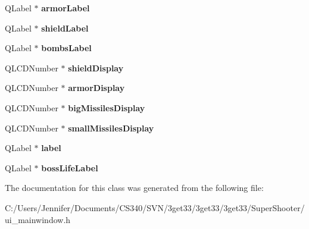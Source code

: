 \begin{DoxyCompactItemize}
\item 
\hypertarget{class_ui___main_window_afb015b408d3d27402d785876acee6737}{
QLabel $\ast$ {\bfseries armorLabel}}
\label{class_ui___main_window_afb015b408d3d27402d785876acee6737}

\item 
\hypertarget{class_ui___main_window_a9628729042c47efc05e7ad4883fb2f40}{
QLabel $\ast$ {\bfseries shieldLabel}}
\label{class_ui___main_window_a9628729042c47efc05e7ad4883fb2f40}

\item 
\hypertarget{class_ui___main_window_a537116ecd77c5999695259ad4f2db90e}{
QLabel $\ast$ {\bfseries bombsLabel}}
\label{class_ui___main_window_a537116ecd77c5999695259ad4f2db90e}

\item 
\hypertarget{class_ui___main_window_a2e2db70a37aa3cd1df87fe7d6f76b672}{
QLCDNumber $\ast$ {\bfseries shieldDisplay}}
\label{class_ui___main_window_a2e2db70a37aa3cd1df87fe7d6f76b672}

\item 
\hypertarget{class_ui___main_window_a95791dda4c16960766792264eb750353}{
QLCDNumber $\ast$ {\bfseries armorDisplay}}
\label{class_ui___main_window_a95791dda4c16960766792264eb750353}

\item 
\hypertarget{class_ui___main_window_a3d6ec1a546ba0456890686c58584f721}{
QLCDNumber $\ast$ {\bfseries bigMissilesDisplay}}
\label{class_ui___main_window_a3d6ec1a546ba0456890686c58584f721}

\item 
\hypertarget{class_ui___main_window_a6030810c2406fe0b9899bfdf5189d540}{
QLCDNumber $\ast$ {\bfseries smallMissilesDisplay}}
\label{class_ui___main_window_a6030810c2406fe0b9899bfdf5189d540}

\item 
\hypertarget{class_ui___main_window_ad9c89133780f28e6efa2ec17ceb9cff5}{
QLabel $\ast$ {\bfseries label}}
\label{class_ui___main_window_ad9c89133780f28e6efa2ec17ceb9cff5}

\item 
\hypertarget{class_ui___main_window_a26b9f80a3e05480f8b6b578f78ea5ef7}{
QLabel $\ast$ {\bfseries bossLifeLabel}}
\label{class_ui___main_window_a26b9f80a3e05480f8b6b578f78ea5ef7}

\end{DoxyCompactItemize}


The documentation for this class was generated from the following file:\begin{DoxyCompactItemize}
\item 
C:/Users/Jennifer/Documents/CS340/SVN/3get33/3get33/3get33/SuperShooter/ui\_\-mainwindow.h\end{DoxyCompactItemize}
